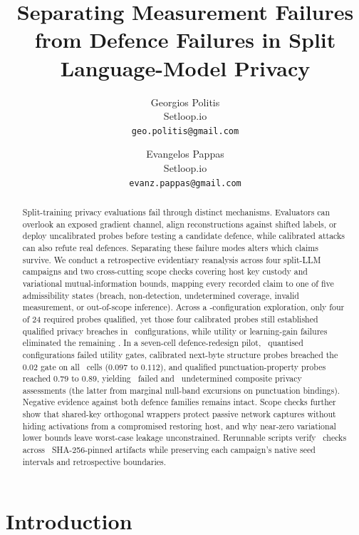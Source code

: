 \documentclass[11pt]{article}
\title{\textbf{Separating Measurement Failures from Defence Failures in Split Language-Model Privacy}}
\author{Georgios Politis\\ Setloop.io\\ {\small\texttt{geo.politis@gmail.com}} \and
Evangelos Pappas\\ Setloop.io\\ {\small\texttt{evanz.pappas@gmail.com}}}
\date{}
\begin{document}
\maketitle
\begin{abstract}
Split-training privacy evaluations fail through distinct mechanisms.
Evaluators can overlook an exposed gradient channel, align reconstructions
against shifted labels, or deploy uncalibrated probes before testing a
candidate defence, while calibrated attacks can also refute real defences.
Separating these failure modes alters which claims survive. We conduct a
retrospective evidentiary reanalysis across four split-LLM campaigns and
two cross-cutting scope checks covering host key custody and variational
mutual-information bounds, mapping every recorded claim to one of five
admissibility states (breach, non-detection, undetermined coverage, invalid
measurement, or out-of-scope inference). Across a \RoneCells-configuration
exploration, only four of 24 required probes qualified, yet those four
calibrated probes still established qualified privacy breaches in
\RoneQualifiedBreaches\ configurations, while utility or learning-gain
failures eliminated the remaining \RoneUndetermined. In a seven-cell
defence-redesign pilot, \PfourUtilityFailures\ quantised configurations
failed utility gates, calibrated next-byte structure probes breached the
$0.02$ gate on all \PfourCells\ cells ($0.097$ to $0.112$), and qualified
punctuation-property probes reached $0.79$ to $0.89$, yielding
\PfourPrivacyFailures\ failed and \PfourPrivacyUndetermined\ undetermined
composite privacy assessments (the latter from marginal null-band
excursions on punctuation bindings). Negative evidence against both defence
families remains intact. Scope checks further show that shared-key
orthogonal wrappers protect passive network captures without hiding
activations from a compromised restoring host, and why near-zero
variational lower bounds leave worst-case leakage unconstrained. Rerunnable
scripts verify \ConsistencyChecks\ checks across \PinnedInputs\
SHA-256-pinned artifacts while preserving each campaign's native seed
intervals and retrospective boundaries.
\end{abstract}

\section{Introduction}
\label{sec:intro}
\end{document}
